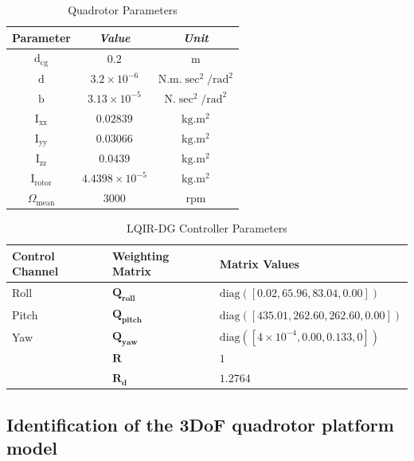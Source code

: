 \documentclass[3p,times]{elsarticle}
\begin{document}
\begin{table}[H]
	\renewcommand{\arraystretch}{1.3}
	\caption{Quadrotor Parameters}
	\begin{center}
	\begin{tabular}{c c c}
	\hline
	\textbf{Parameter} & \textbf{\textit{Value}}& \textbf{\textit{Unit}} \\
	\hline
	$\mathrm{d}_{\text{cg}}$  & $0.2$ & $\mathrm{m}$\\
	$\mathrm{d}$  & $3.2\times10^{-6}$ & $\mathrm{N.m.\sec^2/rad^2}$\\
	$\mathrm{b}$  & $3.13\times10^{-5}$ & $\mathrm{N.\sec^2/rad^2}$ \\
	$\mathrm{I}_{\text{xx}}$ & $0.02839$ & $\mathrm{kg.m^2}$ \\
	$\mathrm{I}_{\text{yy}}$  & $0.03066$ & $\mathrm{kg.m^2}$\\
	$\mathrm{I}_{\text{zz}}$  & $0.0439$ & $\mathrm{kg.m^2}$ \\
	$\mathrm{I}_{\text{rotor}}$  & $4.4398\times 10^{-5}$ & $\mathrm{kg.m^2}$\\
	
	
	$\Omega_{\text{mean}}$ & $3000$ & $\mathrm{rpm}$\\
	
	\hline
	\end{tabular}
	\label{tab:parameters}
	\end{center}
\end{table}


\begin{table}[H]
	\centering
	\caption{LQIR-DG Controller Parameters}
	\renewcommand{\arraystretch}{1.3}
	\begin{tabular}{@{}lll@{}}
	\toprule
	\textbf{Control Channel} & \textbf{Weighting Matrix} & \textbf{Matrix Values} \\
	\midrule
	Roll & $\mathbf{Q_{roll}}$ & $\text{diag}([0.02, 65.96, 83.04, 0.00])$ \\
	Pitch & $\mathbf{Q_{pitch}}$ & $\text{diag}([435.01, 262.60, 262.60, 0.00])$ \\
	Yaw & $\mathbf{Q_{yaw}}$ & $\text{diag}([4 \times 10^{-4}, 0.00, 0.133, 0])$ \\
	& $\mathbf{R}$ & $1$ \\
	&$\mathbf{R_d}$ & $1.2764$ \\
	\bottomrule
	\end{tabular}
	\label{tab:control weight_new}
\end{table}




\subsection{Identification of the 3DoF quadrotor platform model}
\end{document}
